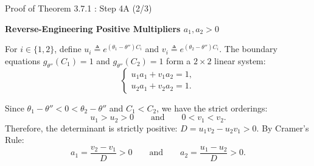\documentclass[10pt, aspectratio=169, xcolor=dvipsnames]{beamer}
\newcommand{\lead}[1]{{\color{UniBlue}\bfseries #1}}
\begin{document}
\begin{frame}{Proof of Theorem 3.7.1 : Step 4A (2/3)}
    
    \lead{Reverse-Engineering Positive Multipliers $a_1, a_2 > 0$}\\
    \vspace{0.2cm}
    
    \color{Slate}
    For $i \in \{1, 2\}$, define $u_i \triangleq e^{(\theta_1 - \theta'') C_i}$ and $v_i \triangleq e^{(\theta_2 - \theta'') C_i}$. The boundary equations $g_{\theta''}(C_1) = 1$ and $g_{\theta''}(C_2) = 1$ form a $2 \times 2$ linear system:
    \[
        \begin{cases}
            u_1 a_1 + v_1 a_2 = 1, \\
            u_2 a_1 + v_2 a_2 = 1.
        \end{cases}
    \]
    
    \vspace{0.1cm}
    Since $\theta_1 - \theta'' < 0 < \theta_2 - \theta''$ and $C_1 < C_2$, we have the strict orderings:
    \[
        u_1 > u_2 > 0
        \qquad \text{and} \qquad
        0 < v_1 < v_2.
    \]
    Therefore, the determinant is strictly positive: $D = u_1 v_2 - u_2 v_1 > 0$. By Cramer's Rule:
    \[
        a_1 = \frac{v_2 - v_1}{D} > 0
        \qquad \text{and} \qquad
        a_2 = \frac{u_1 - u_2}{D} > 0.
    \]
\end{frame}
\end{document}
